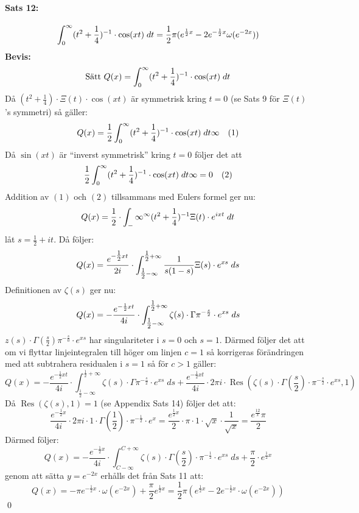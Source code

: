 \documentclass[a4paper,twoside]{article}%
\begin{document}
\paragraph{Sats 12:} 
\[
	\int_0^\infty (t^2 + \frac 1 4)^{-1} \cdot \cos(xt) \; dt = \frac 1 2 \pi(e^{\frac 1 2 x} -
		2e^{-\frac 1 2 x} \omega(e^{- 2 x}))
\]
{\bf Bevis:}\\
\[
	\text{Sätt } Q(x) = \int_0^\infty (t^2 + \frac 1 4)^{-1} \cdot \cos(xt) \; dt
\]
Då $(t^2 + \frac 1 4) \cdot \Xi(t) \cdot \cos(xt)$ är symmetrisk kring $t = 0$ (se Sats 9 för $\Xi(t)$'s symmetri)
så gäller:
\newcommand{\mQ} {
	\frac 1 2 \twelve{\infty}
}
\[
	Q(x) = \mQ \quad (1)
\]
Då $\sin(xt)$ är ``inverst symmetrisk'' kring $t = 0$ följer det att 
\[
	\mQ = 0 \quad (2)
\]
Addition av $(1)$ och $(2)$ tillsammans med Eulers formel ger nu: 
\[
	Q(x) = \frac 1 2 \cdot \int_-\infty^\infty (t^2 + \frac 1 4)^{-1} \Xi(t)\cdot e^{ixt} \; dt
\]
låt $s = \frac 1 2 + it$. Då följer:
\[
	Q(x) = \frac {
		e^{- \tfrac 1 2 x t}
	} {
		2i
	} \cdot \int_{\tfrac 1 2 - \infty}^{\tfrac 1 2 + \infty}
		\frac {1} {s(1-s)} \Xi(s) \cdot e^{xs} \; ds
\]
Definitionen av $\zeta(s)$ ger nu:
\[
	Q(x) = - \frac {
		e^{- \frac 1 2 xt}
	} {
		4i
	} \cdot \int_{\tfrac 1 2 - \infty}^{\tfrac 1 2 + \infty} \zeta(s) \cdot \Gamma
		\pi^{- \frac s 2} \cdot e^{xs} \; ds
\]
$z(s) \cdot \Gamma(\frac s 2) \pi^{- \frac s 0} \cdot e^{xs}$ har singulariteter i $s = 0$ och $s = 1$.
Därmed följer det att om vi flyttar linjeintegralen till höger om linjen $c=1$ så korrigeras förändringen med att 
subtrahera residualen i $s = 1$ så för $c > 1$ gäller:
\[
	Q(x) = - \frac {e^{- \frac 1 2 xt}} {4i} \cdot \int_{\tfrac 1 2 - \infty}^{\tfrac 1 2 + \infty} \zeta(s) \cdot \Gamma
		\pi^{- \frac s 2} \cdot e^{xs} \; ds + \frac {e^{- \frac 1 2 xt}} {4i} \cdot2 \pi i \cdot \operatorname{Res}(\zeta(s) \cdot
		\Gamma(\frac s 2) \cdot \pi^{-\frac s 2} \cdot e^{xs}, 1)
\]
Då $\operatorname{Res}(\zeta(s), 1) = 1$ (se Appendix Sats 14) följer det att:
\[
	\frac {e^{- \frac 1 2 x}} {4i} \cdot 2 \pi i \cdot 1 \cdot \Gamma(\frac 1 2) \cdot \pi^{- \frac 1 2} \cdot e^x =
		\frac {e^{\frac 1 2 x}} {2} \cdot \pi \cdot 1 \cdot \sqrt{x} \cdot \frac {1} {\sqrt{x}} = \frac {e^{\frac {1 2} x} \pi} {2}
\]
Därmed följer:
\[
	Q(x) = - \frac {e^{-\frac 1 2 x}} {4 i} \cdot \int_{C - \infty}^{C + \infty} \zeta(s) \cdot \Gamma(\frac s 2)
		\cdot \pi^{- \frac 1 2} \cdot e^{xs} \; ds + \frac \pi 2 \cdot e^{\frac 1 2 x}
\]
genom att sätta $y = e^{-2x}$ erhålls det från Sats 11 att:
\[
	Q(x) = - \pi e^{- \frac 1 2 x} \cdot \omega(e^{- 2 x}) + \frac \pi 2 e^{\frac 1 2 x} = \frac 1 2 \pi
		(e^{\frac 1 2 x} - 2 e^{- \frac 1 2 x} \cdot \omega(e^{-2x}))
\]
\hfill \qed
\end{document}
